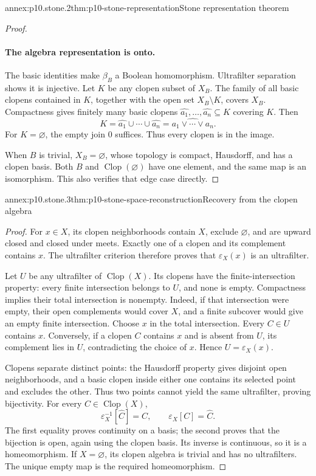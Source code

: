 \begin{annexitem}{annex:p10.stone.2}{thm:p10-stone-representation}{Stone representation theorem}
\begin{proof}
\paragraph{The algebra representation is onto.}
The basic identities make \(\beta_B\) a Boolean homomorphism.
Ultrafilter separation shows it is injective.
Let \(K\) be any clopen subset of \(X_B\).
The family of all basic clopens contained in \(K\), together with
the open set \(X_B\setminus K\), covers \(X_B\).
Compactness gives finitely many basic clopens
\(\widehat{a_1},\ldots,\widehat{a_n}\subseteq K\) covering \(K\).
Then
\[
 K=\widehat{a_1}\cup\cdots\cup\widehat{a_n}
   =\widehat{a_1\vee\cdots\vee a_n}.
\]
For \(K=\varnothing\), the empty join \(0\) suffices.
Thus every clopen is in the image.

When \(B\) is trivial, \(X_B=\varnothing\), whose topology is compact,
Hausdorff, and has a clopen basis. Both \(B\) and
\(\operatorname{Clop}(\varnothing)\) have one element, and the
same map is an isomorphism. This also verifies that edge case directly.
\end{proof}
\end{annexitem}

\begin{annexitem}{annex:p10.stone.3}{thm:p10-stone-space-reconstruction}{Recovery from the clopen algebra}
\begin{proof}
For \(x\in X\), its clopen neighborhoods contain \(X\), exclude
\(\varnothing\), and are upward closed and closed under meets.
Exactly one of a clopen and its complement contains \(x\).
The ultrafilter criterion therefore proves that \(\varepsilon_X(x)\)
is an ultrafilter.

Let \(U\) be any ultrafilter of \(\operatorname{Clop}(X)\).
Its clopens have the finite-intersection property: every finite
intersection belongs to \(U\), and none is empty.
Compactness implies their total intersection is nonempty.
Indeed, if that intersection were empty, their open complements
would cover \(X\), and a finite subcover would give an empty finite
intersection.
Choose \(x\) in the total intersection.
Every \(C\in U\) contains \(x\).
Conversely, if a clopen \(C\) contains \(x\) and is absent from \(U\),
its complement lies in \(U\), contradicting the choice of \(x\).
Hence \(U=\varepsilon_X(x)\).

Clopens separate distinct points: the Hausdorff property gives
disjoint open neighborhoods, and a basic clopen inside either one
contains its selected point and excludes the other.
Thus two points cannot yield the same ultrafilter, proving
bijectivity.
For every \(C\in\operatorname{Clop}(X)\),
\[
 \varepsilon_X^{-1}[\widehat C]=C,
 \qquad \varepsilon_X[C]=\widehat C.
\]
The first equality proves continuity on a basis; the second proves
that the bijection is open, again using the clopen basis.
Its inverse is continuous, so it is a homeomorphism.
If \(X=\varnothing\), its clopen algebra is trivial and has no
ultrafilters. The unique empty map is the required homeomorphism.
\end{proof}
\end{annexitem}

